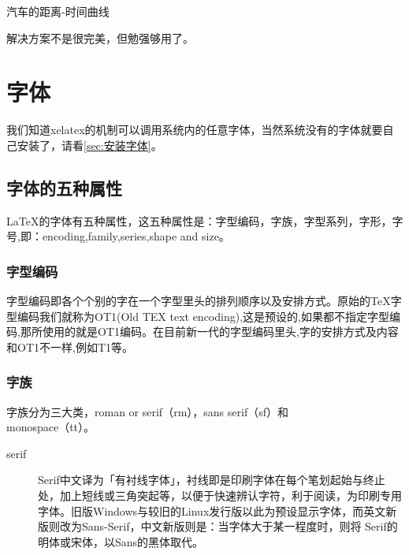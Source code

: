 \documentclass[12pt,oneside]{book}
\begin{document}
\begin{common-format}
\begin{minipage}{\textwidth}
\begin{minipage}{0.3\textwidth}
\end{minipage}\hfill
\begin{minipage}{0.7\textwidth}
\begin{linefig}[0.9]{汽车的距离-时间曲线}
\caption{汽车的距离-时间曲线}
\label{fig:汽车的距离-时间曲线}
\end{linefig}
\end{minipage} 
\end{minipage} 

解决方案不是很完美，但勉强够用了。





\section{字体}
我们知道xelatex的机制可以调用系统内的任意字体，当然系统没有的字体就要自己安装了，请看\ref{sec:安装字体}。

\subsection{字体的五种属性}
\LaTeX 的字体有五种属性，这五种属性是：字型编码，字族，字型系列，字形，字号,即：encoding,family,series,shape and size。

\subsubsection{字型编码}
字型编码即各个个别的字在一个字型里头的排列顺序以及安排方式。原始的\TeX 字型编码我们就称为OT1(Old TEX text encoding),这是预设的,如果都不指定字型编码,那所使用的就是OT1编码。在目前新一代的字型编码里头,字的安排方式及内容和OT1不一样,例如T1等。


\subsubsection{字族}
字族分为三大类，roman or serif（rm），sans serif（sf）和\\monospace（tt）。


\begin{description}
\item[serif] Serif中文译为「有衬线字体」，衬线即是印刷字体在每个笔划起始与终止处，加上短线或三角突起等，以便于快速辨认字符，利于阅读，为印刷专用字体。旧版Windows与较旧的Linux发行版以此为预设显示字体，而英文新版则改为Sans-Serif，中文新版则是：当字体大于某一程度时，则将 Serif的明体或宋体，以Sans的黑体取代。


\end{description}
\end{common-format}
\end{document}
